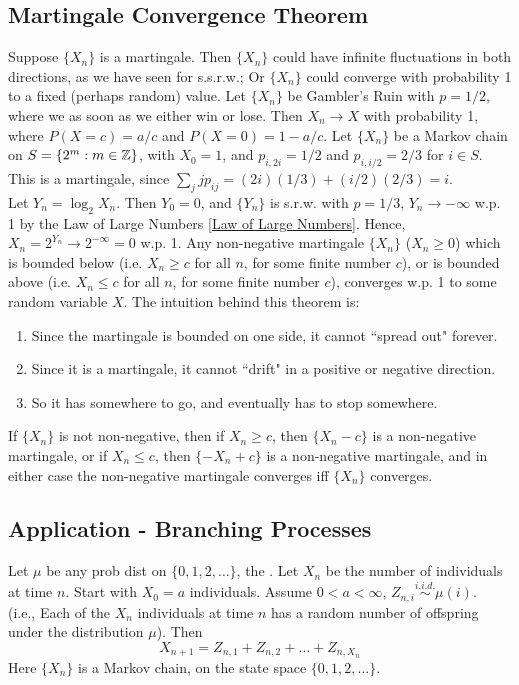 \documentclass[11pt]{article}
\begin{document}
    \subsection{Martingale Convergence Theorem}
    Suppose $\{X_n\}$ is a martingale. Then $\{X_n\}$ could have infinite fluctuations in both directions, as we have seen for s.s.r.w.; Or $\{X_n\}$ could converge with probability 1 to a fixed (perhaps random) value.
    \example
    Let $\{X_n\}$ be Gambler's Ruin with $p = 1/2$, where we  as soon as we either win or lose. Then $X_n \rightarrow X$ with probability 1, where $P(X = c) = a/c$ and $P(X=0) = 1 - a/c$.
    \example
    Let $\{X_n\}$ be a Markov chain on $S = \{2^m: m \in \mathbb{Z}\}$, with $X_0 = 1$, and $p_{i,2i} = 1/2$ and $p_{i, i/2} = 2/3$ for $i \in S$. This is a martingale, since $\sum_{j} jp_{ij} = (2i)(1/3) + (i/2)(2/3) = i$.\\
    Let $Y_n = \log_2 X_n$. Then $Y_0 = 0$, and $\{Y_n\}$ is s.r.w. with $p = 1/3$, $Y_n \rightarrow -\infty$ w.p. 1 by the Law of Large Numbers \ref{Law of Large Numbers}. Hence, $X_n = 2^{Y_n} \rightarrow 2^{-\infty} = 0$ w.p. 1.
     Any non-negative martingale $\{X_n\}$ ($X_n \geq 0$) which is bounded below (i.e. $X_n \geq c$ for all $n$, for some finite number $c$), or is bounded above (i.e. $X_n \leq c$ for all $n$, for some finite number $c$), converges w.p. 1 to some random variable $X$.
    \remark
    The intuition behind this theorem is:
    \begin{enumerate}
    	\item Since the martingale is bounded on one side, it cannot ``spread out" forever.
    	\item Since it is a martingale, it cannot ``drift" in a positive or negative direction.
    	\item So it has somewhere to go, and eventually has to stop somewhere.
    \end{enumerate}
   	\remark
   	If $\{X_n\}$ is not non-negative, then if $X_n \geq c$, then $\{X_n - c\}$ is a non-negative martingale, or if $X_n \leq c$, then $\{-X_n + c\}$ is a non-negative martingale, and in either case the non-negative martingale converges iff $\{X_n\}$ converges.
   	\subsection{Application - Branching Processes}
   	Let $\mu$ be any prob dist on $\{0, 1, 2, \hdots\}$, the . Let $X_n$ be the number of individuals at time $n$. Start with $X_0 = a$ individuals. Assume $0 < a < \infty$, $Z_{n,i} \overset{i.i.d.}{\sim} \mu(i)$.\\ (i.e., Each of the $X_n$ individuals at time $n$ has a random number of offspring under the distribution $\mu$). Then 
   	$$X_{n+1} = Z_{n,1} + Z_{n,2} + \hdots + Z_{n,X_n}$$
   	Here $\{X_n\}$ is a Markov chain, on the state space $\{0, 1, 2, \hdots\}$.\\
\end{document}
